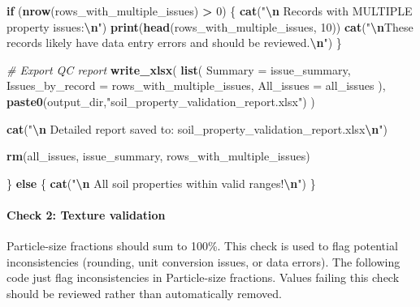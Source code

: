 \documentclass[
  10pt,
  b5paper,
  oneside]{book}
\newenvironment{Shaded}{\begin{snugshade}}{\end{snugshade}}
\newcommand{\AttributeTok}[1]{\textcolor[rgb]{0.13,0.29,0.53}{#1}}
\newcommand{\CommentTok}[1]{\textcolor[rgb]{0.56,0.35,0.01}{\textit{#1}}}
\newcommand{\ControlFlowTok}[1]{\textcolor[rgb]{0.13,0.29,0.53}{\textbf{#1}}}
\newcommand{\DecValTok}[1]{\textcolor[rgb]{0.00,0.00,0.81}{#1}}
\newcommand{\FunctionTok}[1]{\textcolor[rgb]{0.13,0.29,0.53}{\textbf{#1}}}
\newcommand{\NormalTok}[1]{#1}
\newcommand{\SpecialCharTok}[1]{\textcolor[rgb]{0.81,0.36,0.00}{\textbf{#1}}}
\newcommand{\StringTok}[1]{\textcolor[rgb]{0.31,0.60,0.02}{#1}}
\begin{document}
\begin{Shaded}
\begin{Highlighting}[]
  \ControlFlowTok{if}\NormalTok{ (}\FunctionTok{nrow}\NormalTok{(rows\_with\_multiple\_issues) }\SpecialCharTok{\textgreater{}} \DecValTok{0}\NormalTok{) \{}
    \FunctionTok{cat}\NormalTok{(}\StringTok{"}\SpecialCharTok{\textbackslash{}n}\StringTok{ Records with MULTIPLE property issues:}\SpecialCharTok{\textbackslash{}n}\StringTok{"}\NormalTok{)}
    \FunctionTok{print}\NormalTok{(}\FunctionTok{head}\NormalTok{(rows\_with\_multiple\_issues, }\DecValTok{10}\NormalTok{))}
    \FunctionTok{cat}\NormalTok{(}\StringTok{"}\SpecialCharTok{\textbackslash{}n}\StringTok{These records likely have data entry errors and should be reviewed.}\SpecialCharTok{\textbackslash{}n}\StringTok{"}\NormalTok{)}
\NormalTok{  \}}
  
  \CommentTok{\# Export QC report}
  \FunctionTok{write\_xlsx}\NormalTok{(}
    \FunctionTok{list}\NormalTok{(}
      \AttributeTok{Summary =}\NormalTok{ issue\_summary,}
      \AttributeTok{Issues\_by\_record =}\NormalTok{ rows\_with\_multiple\_issues,}
      \AttributeTok{All\_issues =}\NormalTok{ all\_issues}
\NormalTok{    ),}
    \FunctionTok{paste0}\NormalTok{(output\_dir,}\StringTok{"soil\_property\_validation\_report.xlsx"}\NormalTok{)}
\NormalTok{  )}
  
  \FunctionTok{cat}\NormalTok{(}\StringTok{"}\SpecialCharTok{\textbackslash{}n}\StringTok{ Detailed report saved to: soil\_property\_validation\_report.xlsx}\SpecialCharTok{\textbackslash{}n}\StringTok{"}\NormalTok{)}
  
  \FunctionTok{rm}\NormalTok{(all\_issues, issue\_summary, rows\_with\_multiple\_issues)}
  
\NormalTok{\} }\ControlFlowTok{else}\NormalTok{ \{}
  \FunctionTok{cat}\NormalTok{(}\StringTok{"}\SpecialCharTok{\textbackslash{}n}\StringTok{ All soil properties within valid ranges!}\SpecialCharTok{\textbackslash{}n}\StringTok{"}\NormalTok{)}
\NormalTok{\}}
\end{Highlighting}
\end{Shaded}

\paragraph*{Check 2: Texture validation}\label{check-2-texture-validation}

Particle-size fractions should sum to 100\%. This check is used to flag potential inconsistencies (rounding, unit conversion issues, or data errors). The following code just flag inconsistencies in Particle-size fractions. Values failing this check should be reviewed rather than automatically removed.
\end{document}
